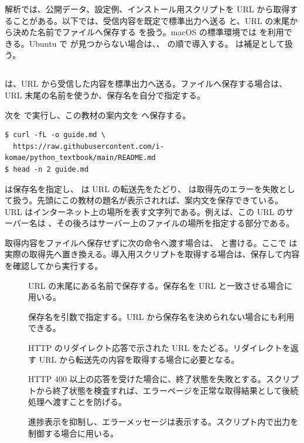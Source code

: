解析では、公開データ、設定例、インストール用スクリプトを URL から取得することがある。以下では、受信内容を既定で標準出力へ送る  と、URL の末尾から決めた名前でファイルへ保存する  を扱う。macOS の標準環境では  を利用できる。Ubuntu で  が見つからない場合は、、 の順で導入する。 は補足として扱う。

\subsection{}

 は、URL から受信した内容を標準出力へ送る。ファイルへ保存する場合は、URL 末尾の名前を使うか、保存名を自分で指定する。

次を  で実行し、この教材の案内文を  へ保存する。

\begin{lstlisting}[numbers=none, xleftmargin=2\zw]
$ curl -fL -o guide.md \
  https://raw.githubusercontent.com/i-komae/python_textbook/main/README.md
$ head -n 2 guide.md
\end{lstlisting}

 は保存名を指定し、 は URL の転送先をたどり、 は取得先のエラーを失敗として扱う。先頭にこの教材の題名が表示されれば、案内文を保存できている。URL はインターネット上の場所を表す文字列である。例えば、この URL のサーバー名は 、その後ろはサーバー上のファイルの場所を指定する部分である。

取得内容をファイルへ保存せずに次の命令へ渡す場合は、 と書ける。ここで  は実際の取得先へ置き換える。導入用スクリプトを取得する場合は、保存して内容を確認してから実行する。

\begin{description}
\item[] URL の末尾にある名前で保存する。保存名を URL と一致させる場合に用いる。
\item[] 保存名を引数で指定する。URL から保存名を決められない場合にも利用できる。
\item[] HTTP のリダイレクト応答で示された URL をたどる。リダイレクトを返す URL から転送先の内容を取得する場合に必要となる。
\item[\code{-f}] HTTP 400 以上の応答を受けた場合に、終了状態を失敗とする。スクリプトから終了状態を検査すれば、エラーページを正常な取得結果として後続処理へ渡すことを防げる。
\item[\code{-sS}] 進捗表示を抑制し、エラーメッセージは表示する。スクリプト内で出力を制御する場合に用いる。
\end{description}

